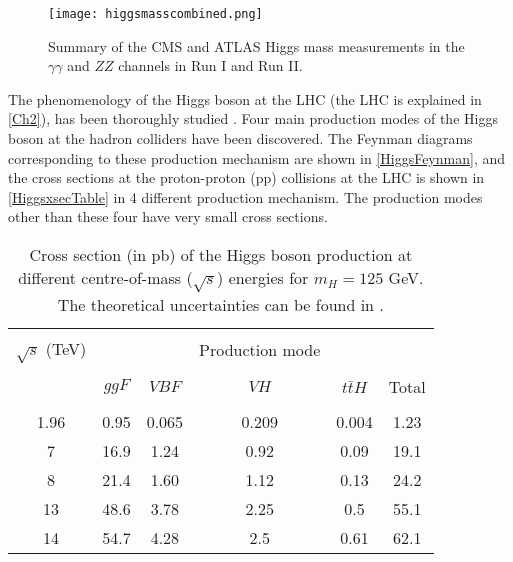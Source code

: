 \begin{figure}[ht]
	\centering
	\texttt{[image: higgsmasscombined.png]}
	\caption[Summary of the CMS and ATLAS Higgs mass measurements in the $\gamma\gamma$ and $ZZ$ channels in Run I and Run II.]{Summary of the CMS and ATLAS Higgs mass measurements in the $\gamma\gamma$ and $ZZ$ channels in Run I and Run II\cite{pdg}.}
	\label{higgsmasssummary}
\end{figure}

The phenomenology of the Higgs boson at the LHC (the LHC is explained in \autoref{Ch2}), has been thoroughly studied \cite{higg-phen-1,higg-phen-2,higg-phen-3}. Four main production modes of the Higgs boson at the hadron colliders have been discovered. The Feynman diagrams corresponding to these production mechanism are shown in \autoref{HiggsFeynman}, and the cross sections at the proton-proton (pp) collisions at the LHC is shown in \autoref{HiggsxsecTable} in 4 different production mechanism. The production modes other than these four have very small cross sections.

\begin{table*}[ht]
	{\setlength{\tabcolsep}{14pt}
		\caption[Cross section (in pb) of the Higgs boson production at different centre-of-mass ($\sqrt{s}$) energies for $m_H=125$ GeV. The theoretical uncertainties can be found in the reference.]{Cross section (in pb) of the Higgs boson production at different centre-of-mass ($\sqrt{s}$) energies for $m_H=125$ GeV. The theoretical uncertainties can be found in \cite{pdg}.}
		\begin{center}
			\vspace{-6mm}
			\begin{tabular}{cccccc}
				\hline \\[-2.45ex] \hline \\[-2.1ex]
				$\sqrt{s}$ (TeV) &&&Production mode&&\\
				\hline \\[-1.8ex]
				& $ggF$ & $VBF$ & $VH$ & $t\bar tH$ & Total \\
				\hline \\[-1.8ex]
                1.96 & 0.95 & 0.065 & 0.209 & 0.004 & 1.23 \\
                7 & 16.9 & 1.24 & 0.92 & 0.09 & 19.1 \\
                8 & 21.4 & 1.60 & 1.12 & 0.13 & 24.2 \\
                13 & 48.6 & 3.78 & 2.25 & 0.5 & 55.1 \\
                14 & 54.7 & 4.28 & 2.5 & 0.61 & 62.1 \\
				\hline
			\end{tabular}
			\vspace{-6mm}
		\end{center}
		\label{HiggsxsecTable}}
\end{table*}

